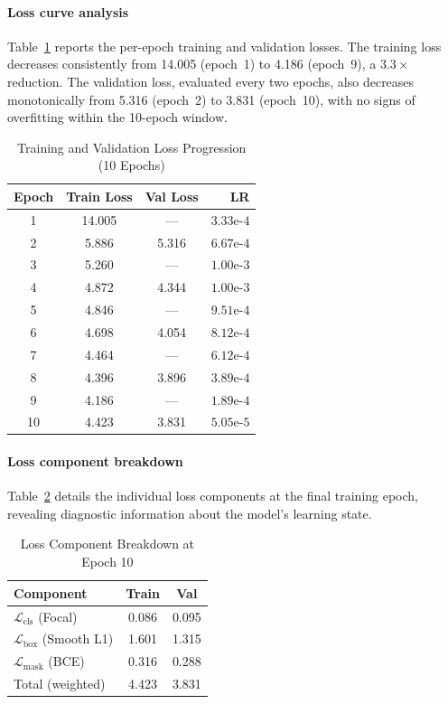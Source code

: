 \documentclass[conference]{IEEEtran}
\begin{document}
\paragraph{Loss curve analysis}
Table~\ref{tab:loss_curve} reports the per-epoch training and validation
losses. The training loss decreases consistently from 14.005 (epoch~1)
to 4.186 (epoch~9), a $3.3\times$ reduction. The validation loss,
evaluated every two epochs, also decreases monotonically from 5.316
(epoch~2) to 3.831 (epoch~10), with no signs of overfitting within the
10-epoch window.

\begin{table}[t]
  \centering
  \caption{Training and Validation Loss Progression (10 Epochs)}
  \label{tab:loss_curve}
  \begin{tabular}{@{}cccr@{}}
    \toprule
    Epoch & Train Loss & Val Loss & LR \\
    \midrule
    1  & 14.005 & ---   & $3.33\text{e-}4$ \\
    2  & 5.886  & 5.316 & $6.67\text{e-}4$ \\
    3  & 5.260  & ---   & $1.00\text{e-}3$ \\
    4  & 4.872  & 4.344 & $1.00\text{e-}3$ \\
    5  & 4.846  & ---   & $9.51\text{e-}4$ \\
    6  & 4.698  & 4.054 & $8.12\text{e-}4$ \\
    7  & 4.464  & ---   & $6.12\text{e-}4$ \\
    8  & 4.396  & 3.896 & $3.89\text{e-}4$ \\
    9  & 4.186  & ---   & $1.89\text{e-}4$ \\
    10 & 4.423  & 3.831 & $5.05\text{e-}5$ \\
    \bottomrule
  \end{tabular}
\end{table}

\paragraph{Loss component breakdown}
Table~\ref{tab:loss_components} details the individual loss components
at the final training epoch, revealing diagnostic information about
the model's learning state.

\begin{table}[t]
  \centering
  \caption{Loss Component Breakdown at Epoch 10}
  \label{tab:loss_components}
  \begin{tabular}{@{}lcc@{}}
    \toprule
    Component & Train & Val \\
    \midrule
    $\mathcal{L}_{\text{cls}}$ (Focal)     & 0.086 & 0.095 \\
    $\mathcal{L}_{\text{box}}$ (Smooth L1) & 1.601 & 1.315 \\
    $\mathcal{L}_{\text{mask}}$ (BCE)      & 0.316 & 0.288 \\
    \midrule
    Total (weighted)                        & 4.423 & 3.831 \\
    \bottomrule
  \end{tabular}
\end{table}
\end{document}
